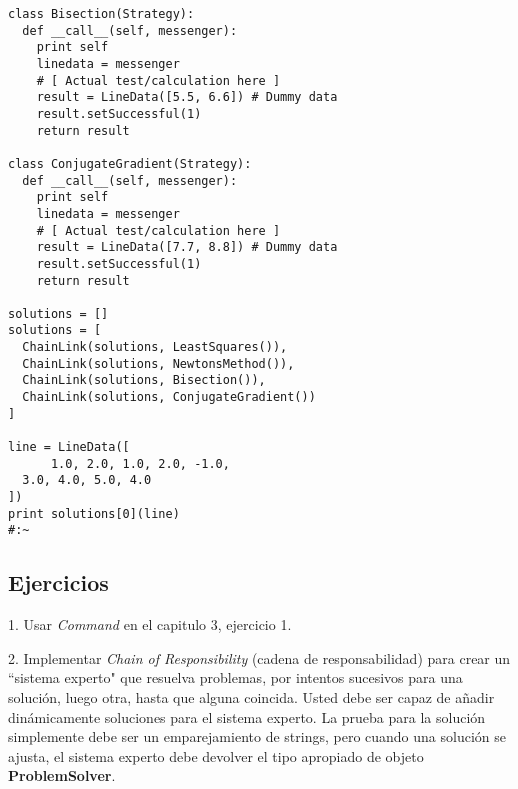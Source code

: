 \begin{lstlisting}
class Bisection(Strategy): 
  def __call__(self, messenger): 
    print self 
    linedata = messenger 
    # [ Actual test/calculation here ] 
    result = LineData([5.5, 6.6]) # Dummy data 
    result.setSuccessful(1) 
    return result 
    
class ConjugateGradient(Strategy): 
  def __call__(self, messenger): 
    print self 
    linedata = messenger 
    # [ Actual test/calculation here ] 
    result = LineData([7.7, 8.8]) # Dummy data 
    result.setSuccessful(1) 
    return result 
    
solutions = [] 
solutions = [ 
  ChainLink(solutions, LeastSquares()), 
  ChainLink(solutions, NewtonsMethod()), 
  ChainLink(solutions, Bisection()), 
  ChainLink(solutions, ConjugateGradient()) 
] 

line = LineData([  
      1.0, 2.0, 1.0, 2.0, -1.0,  
  3.0, 4.0, 5.0, 4.0  
]) 
print solutions[0](line) 
#:~ 
\end{lstlisting}


\subsection*{Ejercicios}
\label{subsec:Ejercicios09}

1. Usar \textit{Command} en el capitulo 3, ejercicio 1.     \newline

2. Implementar \textit{Chain of Responsibility} (cadena de responsabilidad) para crear un “sistema experto" que resuelva problemas, por intentos sucesivos para una solución, luego otra, hasta que alguna coincida. Usted debe ser capaz de añadir dinámicamente soluciones para el sistema experto. La prueba para la solución simplemente debe ser un emparejamiento de strings, pero cuando una solución se ajusta, el sistema experto debe devolver el tipo apropiado de objeto \textbf{ProblemSolver}.     \newline